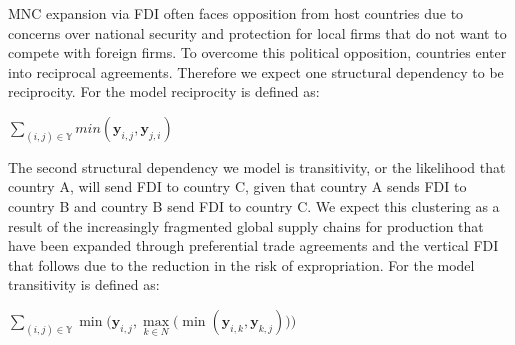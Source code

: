 \documentclass[landscape,a0paper,fontscale=0.285]{baposter} %
\begin{document}
\begin{poster}
{MNC expansion via FDI often faces opposition from host countries due to concerns over national security and protection for local firms that do not want to compete with foreign firms. To overcome this political opposition, countries enter into reciprocal agreements. Therefore we expect one structural dependency to be reciprocity. For the model reciprocity is defined as:

\vspace{.2cm}
\hspace{2cm}$\sum_{(i,j) {\in} \mathbb{Y}}min(\bm{y}_{i,j},\bm{y}_{j,i})$
\vspace{.2cm}


The second structural dependency we model is transitivity, or the likelihood that country A, will send FDI to country C, given that country A sends FDI to country B and country B send FDI to country C. We expect this clustering as a result of the increasingly fragmented global supply chains for production that have been expanded through preferential trade agreements and the vertical FDI that follows due to the reduction in the risk of expropriation. For the model transitivity is defined as: 


\vspace{.2cm}
\centering
$ \sum_{(i,j) {\in} \mathbb{Y}}\min\bigg( \bm{y}_{i,j}, \max\limits_{k{\in}N}\Big(\min(\bm{y}_{i,k},\bm{y}_{k,j})\Big) \bigg)$ 
\vspace{.2cm}

}










\end{poster}
\end{document}
